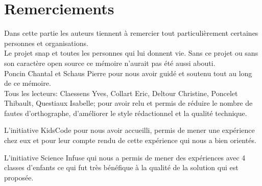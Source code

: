 \section*{Remerciements}
Dans cette partie les auteurs tiennent à remercier tout particulièrement certaines personnes et organisations.\\

Le projet \gls{snap} et toutes les personnes qui lui donnent vie. Sans ce projet ou sans son caractère open source ce mémoire n'aurait pas été aussi abouti.\\

Poncin Chantal et Schaus Pierre pour nous avoir guidé et soutenu tout au long de ce mémoire.\\

Tous les lecteurs: Claessens Yves, Collart Eric, Deltour Christine, Poncelet Thibault, Questiaux Isabelle; pour avoir relu et permis de réduire le nombre de fautes d'orthographe, d'améliorer le style rédactionnel et la qualité technique.

L'initiative KidsCode pour nous avoir accueilli, permis de mener une expérience chez eux et pour leur compte rendu de cette expérience qui nous a bien orientés.

L'initiative Science Infuse qui nous a permis de mener des expériences avec 4 classes d'enfants ce qui fut très bénéfique à la qualité de la solution qui est proposée.

